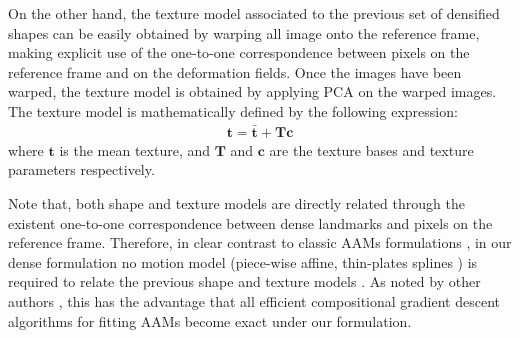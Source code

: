 On the other hand, the texture model associated to the previous set of densified shapes can be easily obtained by warping all image onto the reference frame, making explicit use of the one-to-one correspondence between pixels on the reference frame and on the deformation fields. Once the images have been warped, the texture model is obtained by applying PCA on the warped images. The texture model is mathematically defined by the following expression:
\begin{equation}
    \begin{aligned}
        \bm{t} = \bm{\bar{t}} + \bm{T} \bm{c}
    \end{aligned}
	\label{eq:tex_model}
\end{equation}
where $\bm{t}$ is the mean texture, and $\bm{T}$ and $\bm{c}$ are the texture bases and texture parameters respectively.

Note that, both shape and texture models are directly related through the existent one-to-one correspondence between dense landmarks and pixels on the reference
frame. Therefore, in clear contrast to classic AAMs formulations \cite{Cootes2001, Matthews2004}, in our dense formulation no motion model (piece-wise affine, thin-plates splines \cite{Bookstein1989}) is required to relate the previous shape and texture models . As noted by other authors \cite{Amberg2009, Tzimiropoulos2014}, this has the advantage that all efficient compositional gradient descent algorithms for fitting AAMs \cite{Papandreou2008, Matthews2004, Amberg2009, Tzimiropoulos2013, Alabort2014} become exact under our formulation.

